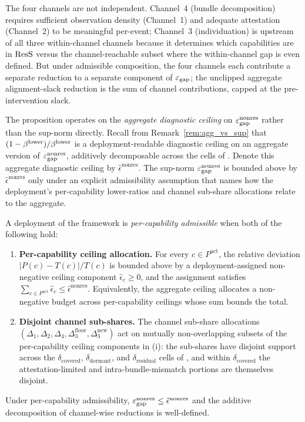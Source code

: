 The four channels are not independent.  Channel~4 (bundle
decomposition) requires sufficient observation density (Channel~1)
and adequate attestation (Channel~2) to be meaningful per-event;
Channel~3 (individuation) is upstream of all three within-channel
channels because it determines which capabilities are in
$\mathrm{ResS}$ versus the channel-reachable subset where the within-channel
gap is even defined.  But under admissible composition, the four
channels each contribute a separate reduction to a separate
component of $\varepsilon_{\mathrm{gap}}$; the unclipped aggregate alignment-slack
reduction is the sum of channel contributions, capped at the
pre-intervention slack.

The proposition operates on the \emph{aggregate diagnostic
ceiling} on $\varepsilon_{\mathrm{gap}}^{\mathrm{nonres}}$ rather than the sup-norm directly.
Recall from Remark~\ref{rem:agg_vs_sup} that
$(1 - \beta^{\mathrm{lower}})/\beta^{\mathrm{lower}}$ is a deployment-readable diagnostic
ceiling on an aggregate version of $\varepsilon_{\mathrm{gap}}^{\mathrm{nonres}}$, additively
decomposable across the cells of
\citep[Definition~8]{lasser2026paper8b}.  Denote this aggregate
diagnostic ceiling by $\hat{\epsilon}^{\mathrm{nonres}}$.  The
sup-norm $\varepsilon_{\mathrm{gap}}^{\mathrm{nonres}}$ is bounded above by
$\hat{\epsilon}^{\mathrm{nonres}}$ only under an explicit
admissibility assumption that names how the deployment's
per-capability lower-ratios and channel sub-share allocations
relate to the aggregate.

\begin{assumption}
\label{ass:per_cap_admissibility}
A deployment of the framework is \emph{per-capability admissible}
when both of the following hold:
\begin{enumerate}
\item[(i)] \textbf{Per-capability ceiling allocation.}  For every
  $c \in P^{\mathrm{act}}$, the relative deviation
  $|P(c) - T(c)|/T(c)$ is bounded above by a deployment-assigned
  non-negative ceiling component $\hat{\epsilon}_c \geq 0$, and
  the assignment satisfies
  $\sum_{c \in P^{\mathrm{act}}} \hat{\epsilon}_c \leq
   \hat{\epsilon}^{\mathrm{nonres}}$.  Equivalently, the
  aggregate ceiling allocates a non-negative budget across
  per-capability ceilings whose sum bounds the total.
\item[(ii)] \textbf{Disjoint channel sub-shares.}  The channel
  sub-share allocations
  $(\Delta_1, \Delta_2, \Delta_4, \Delta_3^{\mathrm{floor}},
   \Delta_3^{\mathrm{new}})$ act on mutually non-overlapping
  subsets of the per-capability ceiling components in (i): the
  sub-shares have disjoint support across the
  $\delta_{\mathrm{covered}}$, $\delta_{\mathrm{dormant}}$, and
  $\delta_{\mathrm{residual}}$ cells of
  \citep[Definition~8]{lasser2026paper8b}, and within
  $\delta_{\mathrm{covered}}$ the attestation-limited and
  intra-bundle-mismatch portions are themselves disjoint.
\end{enumerate}
Under per-capability admissibility, $\varepsilon_{\mathrm{gap}}^{\mathrm{nonres}} \leq
\hat{\epsilon}^{\mathrm{nonres}}$ and the additive
decomposition of channel-wise reductions is well-defined.
\end{assumption}

